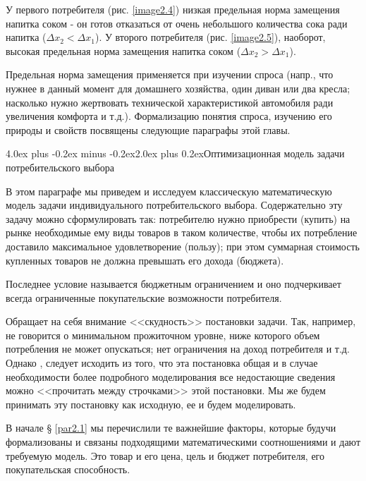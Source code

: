 \documentclass[12pt, 4paper]{book}
\makeatletter
\renewcommand{\section}{\@startsection{section}{1}{1pt}%
	{4.0ex plus -0.2ex minus -0.2ex}{2.0ex plus 0.2ex}{\centering\bf}}%
\makeatother
\begin{document}
{\begin{figure}[h]
\end{figure}
У первого потребителя (рис. \ref{image2.4}) низкая предельная норма замещения напитка соком - он готов отказаться от очень небольшого количества сока ради напитка ($\Delta x_2 < \Delta x_1$). У второго потребителя (рис. \ref{image2.5}), наоборот, высокая предельная норма замещения напитка соком ($\Delta x_2 > \Delta x_1$).
\par

Предельная норма замещения применяется при изучении спроса (напр., что нужнее в данный момент для домашнего хозяйства, один диван или два кресла; насколько нужно жертвовать технической характеристикой автомобиля ради увеличения комфорта и т.д.). Формализацию понятия спроса, изучению его природы и свойств посвящены следующие параграфы этой главы.
\newpage


\begin{center}
\section {Оптимизационная модель задачи потребительского выбора}
\end{center}
\par

В этом параграфе мы приведем и исследуем классическую математическую модель задачи индивидуального потребительского выбора. Содержательно эту задачу можно сформулировать так: потребителю нужно приобрести (купить) на рынке необходимые ему виды товаров в таком количестве, чтобы их потребление доставило максимальное удовлетворение (пользу); при этом суммарная стоимость купленных товаров не должна превышать его дохода (бюджета).

Последнее условие называется бюджетным ограничением и оно подчеркивает всегда ограниченные покупательские возможности потребителя. 
\par

Обращает на себя внимание <<скудность>> постановки задачи. Так, например, не говорится о минимальном прожиточном уровне, ниже которого объем потребления не может опускаться; нет ограничения на доход потребителя и т.д. Однако , следует исходить из того, что эта постановка общая и в случае необходимости более подробного моделирования все недостающие сведения можно <<прочитать между строчками>> этой постановки. Мы же будем принимать эту постановку как исходную, ее и будем моделировать.
\par

В начале {§ \ref{par2.1}} мы перечислили те важнейшие факторы, которые будучи формализованы и связаны подходящими математическими соотношениями и дают требуемую модель. Это товар и его цена, цель и бюджет потребителя, его покупательская способность. 
\par
 
}
\end{document}
